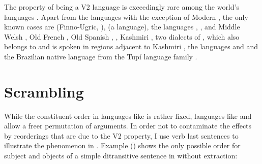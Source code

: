 The property of being a V2 language is exceedingly rare among the world's languages \citep[]{Holmberg2015a}. Apart from the  languages with the exception of 
Modern  \citep{HP86a-ed}, the only known cases are  (Finno-Ugric, \citealp[]{Holmberg2015a}),  \citep[entry~79]{Plank2003b-ed} (a  language), the
 languages  \citep{BK2000a-u},  \citep*[]{BTW2007a-u}, and
Middle Welsh \citep{Willis1998a-u}, Old French \parencites[Section~1.3]{Adams1987a-u}[Section~2.1.2]{Roberts93a-u}[Chapter~2]{Vance97a-u}, Old Spanish
\citep[Section~3.3.2]{Fontana97a-u}, 
 \citep{Poletto2002a-u,Anderson2006a-u}, Kashmiri
\citep[Chapter~4]{Bhatt99a-u}, two dialects of , which also belongs to 
and is spoken in regions adjacent to Kashmiri \citep{Hendriksen90a}, the 
languages  and  \citep[]{Ross2004a-u} and the Brazilian native
language  from the Tupí language family \citep{Storto2003a-u}.


\section{Scrambling}
\label{sec-phenomenon-scrambling}

While the constituent order in languages like  is rather fixed, languages like  and
 allow a freer permutation of arguments. In order not to contaminate the effects by
reorderings that are due to the V2 property, I use verb last sentences to illustrate the
phenomenon in . Example () shows the only possible order for subject and objects of a simple
ditransitive sentence in  without extraction:


